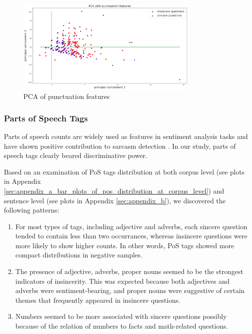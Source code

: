 \documentclass[12pt]{diazessay} %
\begin{document}
{\begin{figure}[ht]
    \includegraphics[width=0.8\textwidth, center]{graphs/pca/2Dpunc.png}
    
    \medskip
    \small
    \caption{PCA of punctuation features} 
    \label{figure:puncpca}
\end{figure}


\subsubsection{Parts of Speech Tags} %
\label{ssub:parts_of_speech_tags}

Parts of speech counts are widely used as features in sentiment analysis tasks \citep{medhat2014} and have shown positive contribution to sarcasm detection \citep{barbosa2010}. In our study, parts of speech tags clearly beared discriminative power. 

Based on an examination of PoS tags distribution at both corpus level (see plots in Appendix \ref{sec:appendix_a_bar_plots_of_pos_distribution_at_corpus_level}) and sentence level (see plots in Appendix \ref{sec:appendix_b}), we discovered the following patterns: 

\begin{enumerate}
    \item For most types of tags, including adjective and adverbs, each sincere question tended to contain less than two occurrances, whereas insincere questions were more likely to show higher counts. In other words, PoS tags showed more compact distributions in negative samples. 
    \item The presence of adjective, adverbs, proper nouns seemed to be the strongest indicators of insincerity. This was expected because both adjectives and adverbs were sentiment-bearing, and proper nouns were suggestive of certain themes that frequently appeared in insincere questions. 
    \item Numbers seemed to be more associated with sincere questions possibly because of the relation of numbers to facts and math-related questions. 
\end{enumerate}

}
\end{document}
